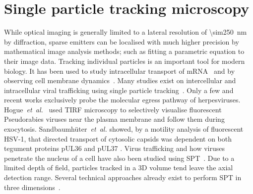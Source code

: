 \section{Single particle tracking microscopy}

While optical imaging is generally limited to a lateral resolution of \SI{\sim250}{\nano\metre} by diffraction, sparse emitters can be localised with much higher precision by mathematical image analysis methods; such as fitting a parametric equation to their image data.
Tracking individual particles is an important tool for modern biology.
It has been used to study intracellular transport of mRNA~\cite{spille_direct_2015} and by observing cell membrane dynamics~\cite{cognet_advances_2014}.
Many studies exist on intercellular and intracellular viral trafficking
using single particle tracking~\cite{(reviewed in [43])}.
Only a few and recent works exclusively probe the molecular egress pathway of herpesviruses.
Hogue~\emph{et~al.}~\cite{[16]} used \gls{TIRF} microscopy to selectively visualise fluorescent Pseudorabies viruses near the plasma membrane and follow them during exocytosis.
Sandbaumhüter~\emph{et~al.} showed, by a motility analysis of fluorescent \gls{HSV}-1, that directed transport of cytosolic capsids was dependent on both tegument proteins pUL36 and pUL37 \cite{[44]}.
Virus trafficking and how viruses penetrate the nucleus of a cell have also been studied using \gls{SPT}~\cite{brandenburg_virus_2007}.
Due to a limited depth of field, particles tracked in a \gls{3D} volume tend leave the axial detection range.
Several technical approaches already exist to perform \gls{SPT} in three dimensions~\cite{[46-49]}.

